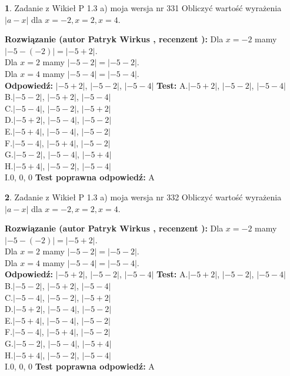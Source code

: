 \documentclass[12pt, a4paper]{article}
\theoremstyle{definition} %
\newtheorem{zad}{}
\newcommand{\zadStart}[1]{\begin{zad}#1\newline}
\newcommand{\zadStop}{\end{zad}}
\newcommand{\rozwStart}[2]{\noindent \textbf{Rozwiązanie (autor #1 , recenzent #2): }\newline}
\newcommand{\rozwStop}{\newline}
\newcommand{\odpStart}{\noindent \textbf{Odpowiedź:}\newline}
\newcommand{\odpStop}{\newline}
\newcommand{\testStart}{\noindent \textbf{Test:}\newline}
\newcommand{\testStop}{\newline}
\newcommand{\kluczStart}{\noindent \textbf{Test poprawna odpowiedź:}\newline}
\newcommand{\kluczStop}{\newline}
\begin{document}
\zadStart{Zadanie z Wikieł P 1.3 a) moja wersja nr 331}
Obliczyć wartość wyrażenia $|a - x|$ dla $x=-2,x=2,x=4$.
\zadStop
\rozwStart{Patryk Wirkus}{}
Dla $x = -2$ mamy $|-5 - (-2)| = |-5 + 2|$.\\
Dla $x = 2$ mamy $|-5 - 2| = |-5 - 2|$.\\
Dla $x = 4$ mamy $|-5 - 4| = |-5 - 4|$.\\
\rozwStop
\odpStart
$|-5 + 2|$, $|-5 - 2|$, $|-5 - 4|$
\odpStop
\testStart
A.$|-5 + 2|$, $|-5 - 2|$, $|-5 - 4|$\\
B.$|-5 - 2|$, $|-5 + 2|$, $|-5 - 4|$\\
C.$|-5 - 4|$, $|-5 - 2|$, $|-5 + 2|$\\
D.$|-5 + 2|$, $|-5 - 4|$, $|-5 - 2|$\\
E.$|-5 + 4|$, $|-5 - 4|$, $|-5 - 2|$\\
F.$|-5 - 4|$, $|-5 + 4|$, $|-5 - 2|$\\
G.$|-5 - 2|$, $|-5 - 4|$, $|-5 + 4|$\\
H.$|-5 + 4|$, $|-5 - 2|$, $|-5 - 4|$\\
I.$0$, $0$, $0$
\testStop
\kluczStart
A
\kluczStop



\zadStart{Zadanie z Wikieł P 1.3 a) moja wersja nr 332}
Obliczyć wartość wyrażenia $|a - x|$ dla $x=-2,x=2,x=4$.
\zadStop
\rozwStart{Patryk Wirkus}{}
Dla $x = -2$ mamy $|-5 - (-2)| = |-5 + 2|$.\\
Dla $x = 2$ mamy $|-5 - 2| = |-5 - 2|$.\\
Dla $x = 4$ mamy $|-5 - 4| = |-5 - 4|$.\\
\rozwStop
\odpStart
$|-5 + 2|$, $|-5 - 2|$, $|-5 - 4|$
\odpStop
\testStart
A.$|-5 + 2|$, $|-5 - 2|$, $|-5 - 4|$\\
B.$|-5 - 2|$, $|-5 + 2|$, $|-5 - 4|$\\
C.$|-5 - 4|$, $|-5 - 2|$, $|-5 + 2|$\\
D.$|-5 + 2|$, $|-5 - 4|$, $|-5 - 2|$\\
E.$|-5 + 4|$, $|-5 - 4|$, $|-5 - 2|$\\
F.$|-5 - 4|$, $|-5 + 4|$, $|-5 - 2|$\\
G.$|-5 - 2|$, $|-5 - 4|$, $|-5 + 4|$\\
H.$|-5 + 4|$, $|-5 - 2|$, $|-5 - 4|$\\
I.$0$, $0$, $0$
\testStop
\kluczStart
A
\kluczStop
\end{document}
